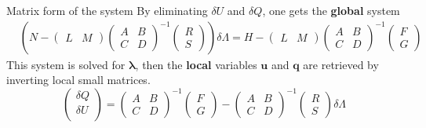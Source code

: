 \documentclass[24pt,t,table, aspectratio=169]{beamer}
\newcommand{\vecu}{\mathbf{u}}
\newcommand{\vecq}{\mathbf{q}}
\newcommand{\veclambda}{\boldsymbol{\lambda}}
\begin{document}
\begin{frame}{Matrix form of the system}
{
By eliminating $\delta U$ and $\delta Q$, one gets the \textbf{global} system
\begin{equation*}
    \begin{aligned}
    &\left(
    N -
    \begin{pmatrix}
        L & M
    \end{pmatrix}
    \begin{pmatrix}
        A & B\\
        C & D
    \end{pmatrix}^{-1}
    \begin{pmatrix}
        R\\
        S
    \end{pmatrix}
    \right)
    \delta \Lambda
    =
    H - 
    \begin{pmatrix}
        L & M
    \end{pmatrix}
    \begin{pmatrix}
        A & B\\
        C & D
    \end{pmatrix}^{-1}
    \begin{pmatrix}
        F\\
        G
    \end{pmatrix}
    \end{aligned}
\end{equation*}
}
{
This system is solved for $\veclambda$, then the \textbf{local} variables $\vecu$ and $\vecq$ are retrieved by inverting local small matrices.
\begin{equation*}
    \begin{pmatrix}
        \delta Q\\
        \delta U\\
    \end{pmatrix}
    =
    \begin{pmatrix}
        A & B\\
        C & D
    \end{pmatrix}^{-1}
    \begin{pmatrix}
        F\\
        G
    \end{pmatrix}
    -
    \begin{pmatrix}
        A & B\\
        C & D
    \end{pmatrix}^{-1}
    \begin{pmatrix}
        R\\
        S
    \end{pmatrix}
    \delta \Lambda
\end{equation*}
}
\end{frame}
\end{document}
